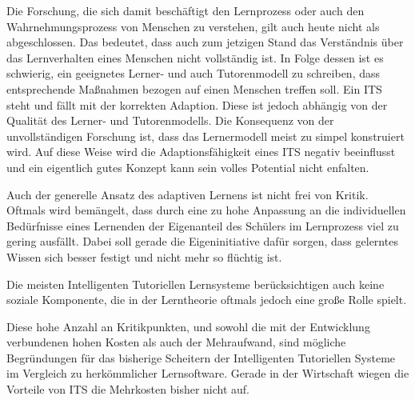 Die Forschung, die sich damit beschäftigt den Lernprozess oder auch den Wahrnehmungsprozess von
Menschen zu verstehen, gilt auch heute nicht als abgeschlossen. Das bedeutet, dass auch zum jetzigen Stand
das Verständnis über das Lernverhalten eines Menschen nicht vollständig ist.
In Folge dessen ist es schwierig, ein geeignetes Lerner- und auch Tutorenmodell zu schreiben,
dass entsprechende Maßnahmen bezogen auf einen Menschen treffen soll. Ein ITS steht und fällt mit der
korrekten Adaption. Diese ist jedoch abhängig von der Qualität des Lerner- und Tutorenmodells.
Die Konsequenz von der unvollständigen Forschung ist, dass das Lernermodell meist zu simpel konstruiert wird.
Auf diese Weise wird die Adaptionsfähigkeit eines ITS negativ beeinflusst und ein eigentlich gutes Konzept
kann sein volles Potential nicht enfalten.

Auch der generelle Ansatz des adaptiven Lernens ist nicht frei von Kritik. Oftmals wird bemängelt, dass durch eine
zu hohe Anpassung an die individuellen Bedürfnisse eines Lernenden der Eigenanteil des Schülers
im Lernprozess viel zu gering ausfällt. Dabei soll gerade die Eigeninitiative
dafür sorgen, dass gelerntes Wissen sich besser festigt und nicht mehr so flüchtig ist.

Die meisten Intelligenten Tutoriellen Lernsysteme berücksichtigen auch keine soziale Komponente, die in der Lerntheorie
oftmals jedoch eine große Rolle spielt.

Diese hohe Anzahl an Kritikpunkten, und sowohl die mit der Entwicklung verbundenen hohen Kosten als auch der Mehraufwand,
sind mögliche Begründungen für das bisherige Scheitern der Intelligenten Tutoriellen Systeme im Vergleich
zu herkömmlicher Lernsoftware. Gerade in der Wirtschaft wiegen die Vorteile von ITS die Mehrkosten bisher nicht auf.
